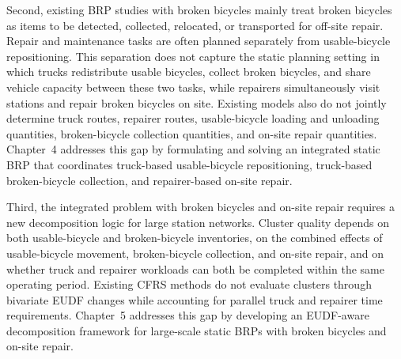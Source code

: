 Second, existing BRP studies with broken bicycles mainly treat broken bicycles as items to be detected, collected, relocated, or transported for off-site repair. Repair and maintenance tasks are often planned separately from usable-bicycle repositioning. This separation does not capture the static planning setting in which trucks redistribute usable bicycles, collect broken bicycles, and share vehicle capacity between these two tasks, while repairers simultaneously visit stations and repair broken bicycles on site. Existing models also do not jointly determine truck routes, repairer routes, usable-bicycle loading and unloading quantities, broken-bicycle collection quantities, and on-site repair quantities. Chapter~4 addresses this gap by formulating and solving an integrated static BRP that coordinates truck-based usable-bicycle repositioning, truck-based broken-bicycle collection, and repairer-based on-site repair.

Third, the integrated problem with broken bicycles and on-site repair requires a new decomposition logic for large station networks. Cluster quality depends on both usable-bicycle and broken-bicycle inventories, on the combined effects of usable-bicycle movement, broken-bicycle collection, and on-site repair, and on whether truck and repairer workloads can both be completed within the same operating period. Existing CFRS methods do not evaluate clusters through bivariate EUDF changes while accounting for parallel truck and repairer time requirements. Chapter~5 addresses this gap by developing an EUDF-aware decomposition framework for large-scale static BRPs with broken bicycles and on-site repair.
